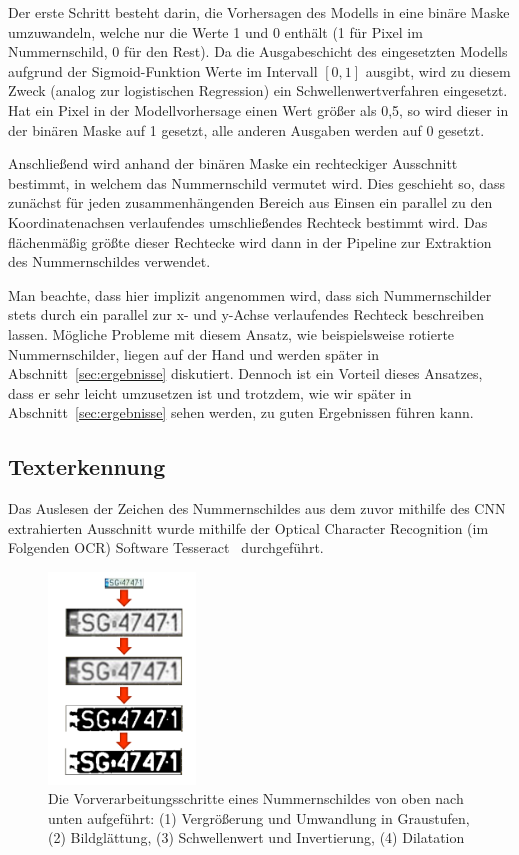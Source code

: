 Der erste Schritt besteht darin, die Vorhersagen des Modells in eine
bin\"are Maske umzuwandeln, welche nur die Werte 1 und 0 enth\"alt
(1 f\"ur Pixel im Nummernschild, 0 f\"ur den Rest).
Da die Ausgabeschicht des eingesetzten Modells aufgrund der
Sigmoid-Funktion Werte im Intervall $[0, 1]$ ausgibt, wird
zu diesem Zweck (analog zur logistischen Regression)
ein Schwellenwertverfahren eingesetzt.
Hat ein Pixel in der Modellvorhersage einen Wert gr\"o{\ss}er als
0,5, so wird dieser in der bin\"aren Maske auf 1 gesetzt, alle
anderen Ausgaben werden auf 0 gesetzt.

Anschlie{\ss}end wird anhand der bin\"aren Maske ein rechteckiger
Ausschnitt bestimmt, in welchem das Nummernschild vermutet wird.
Dies geschieht so, dass zun\"achst f\"ur jeden zusammenh\"angenden
Bereich aus Einsen ein parallel zu den Koordinatenachsen
verlaufendes umschlie{\ss}endes Rechteck bestimmt wird.
Das fl\"achenm\"a{\ss}ig gr\"o{\ss}te dieser Rechtecke wird dann in
der Pipeline zur Extraktion des Nummernschildes verwendet.

Man beachte, dass hier implizit angenommen wird, dass sich
Nummernschilder stets durch ein parallel zur x- und y-Achse
verlaufendes Rechteck beschreiben lassen.
M\"ogliche Probleme mit diesem Ansatz, wie beispielsweise
rotierte Nummernschilder, liegen auf der Hand und werden sp\"ater
in Abschnitt~\ref{sec:ergebnisse} diskutiert.
Dennoch ist ein Vorteil dieses Ansatzes, dass er sehr leicht
umzusetzen ist und trotzdem, wie wir sp\"ater in
Abschnitt~\ref{sec:ergebnisse} sehen werden, zu guten Ergebnissen
f\"uhren kann.

\subsection{Texterkennung}
\label{sec:texterkennung}

Das Auslesen der Zeichen des Nummernschildes aus dem zuvor mithilfe des
CNN extrahierten Ausschnitt wurde mithilfe der
Optical Character Recognition (im Folgenden OCR) Software
Tesseract~\cite{tesseract} durchgef\"uhrt.

\begin{figure}
    \centering
    \includegraphics[width=0.35\textwidth]{abbildungen/license_plate_preprocessing}
    \caption[Vorverarbeitung eines Nummernschildes]{Die Vorverarbeitungsschritte
    eines Nummernschildes von oben nach unten aufgef\"uhrt:
    (1) Vergr\"o{\ss}erung und Umwandlung in Graustufen,
    (2) Bildgl\"attung,
    (3) Schwellenwert und Invertierung,
    (4) Dilatation}
    \label{fig:license-plate-preprocessing}
\end{figure}


